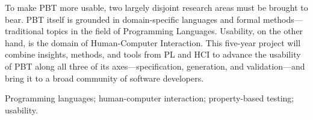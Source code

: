 

To make PBT more usable, two largely disjoint
research areas must be
brought to bear.  PBT itself is grounded in domain-specific languages
and formal methods---traditional topics in the field of Programming Languages.
Usability, on the other hand, is the domain of Human-Computer Interaction.
%
This five-year project will combine insights, methods, and tools from
PL and HCI to advance the usability of PBT along all three of its
axes---specification, generation, and validation\iflater{}\fi---and bring it to a
broad community of software developers.

\smallskip

 Programming languages; human-computer
interaction; property-based testing; usability.

